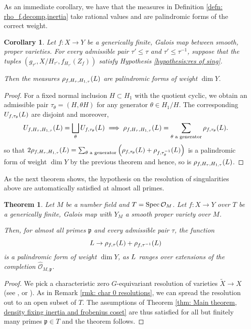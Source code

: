 \documentclass[10pt]{article}
\theoremstyle{plain}
\newtheorem{thm}[theorem]{Theorem}
\newtheorem{corollary}[theorem]{Corollary}
\theoremstyle{definition}
\numberwithin{equation}{section}
\begin{document}
As an immediate corollary, we have that the measures in Definition \ref{defn: rho_f,decomp,inertia} take rational values and are palindromic forms of the correct weight.

\begin{corollary}\label{cor: symmetry for fixed inertia, decomp}
Let $f: X \to Y$ be a generically finite, Galois map between \emph{smooth, proper} varieties. For every admissible pair $\tau' \leq \tau$ and $\tau' \leq \tau^{-1}$, suppose that the tuples $(g_{\tau'},X/H_{\tau'},f_{H_{\tau'}}(Z_f))$ satisfy Hypothesis \ref{hypothesis:res of sing}. 

Then the measures $\rho_{f,H_\tau, H_{1,\tau}}({L})$ are palindromic forms of weight $\dim Y$.
\end{corollary}
\begin{proof}

For a fixed normal inclusion $H \subset H_1$ with the quotient cyclic, we obtain an admissible pair $\tau_{\theta} = (H, \theta H)$ for any generator $\theta \in H_1/H$. The corresponding $U_{f,\tau_\theta}({L})$ are disjoint and moreover, 
\[U_{f,H_\tau, H_{1,\tau}}({L}) = \bigsqcup_\theta U_{f,\tau_\theta}({L}) \implies \rho_{f,H_\tau, H_{1,\tau}}({L}) = \sum_{\theta \text{ a generator}} \rho_{f,\tau_\theta}({L}).\]
so that $2\rho_{f,H_\tau, H_{1,\tau}}({L}) = \sum_{\theta \text{ a generator}} \left(\rho_{f,\tau_\theta}({L}) + \rho_{f,\tau^{-1}_\theta}({L})\right)$ is a palindromic form of weight $\dim Y$ by the previous theorem and hence, so is $\rho_{f,H_\tau, H_{1,\tau}}({L})$.
\end{proof}

As the next theorem shows, the hypothesis on the resolution of singularities above are automatically satisfied at almost all primes.

\begin{thm}\label{thm: main theorem for almost all primes}
Let $M$ be a number field and $T = \operatorname{Spec} \mathcal O_M$. Let $f:X\to Y$ over $T$ be a generically finite, Galois map with $Y_M$ a smooth proper variety over $M$. 

Then, for almost all primes $\mathfrak p$ and every admissible pair $\tau$, the function
\[{L} \to \rho_{f,\tau}({L}) + \rho_{f,\tau^{-1}}({L})\]
is a palindromic form of weight $\dim Y$, as ${L}$ ranges over extensions of the completion $\widehat{\mathcal O}_{M,\mathfrak p}$.
\end{thm}
\begin{proof}
We pick a characteristic zero $G$-equivariant resolution of varieties $\tilde{X} \to X$ (see \cite{abramovich1996equivariant},\cite{encinas1998good} or \cite{bierstone1997canonical}). As in Remark \ref{rmk: char 0 resolutions}, we can spread the resolution out to an open subset of $T$. The assumptions of Theorem \ref{thm: Main theorem, density fixing inertia and frobenius coset} are thus satisfied for all but finitely many primes $\mathfrak p \in T$ and the theorem follows.
\end{proof}
\end{document}
